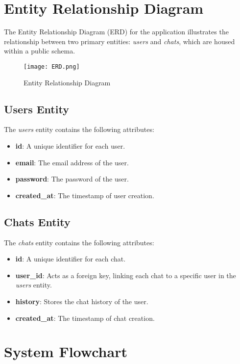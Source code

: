 \section{Entity Relationship Diagram}

The Entity Relationship Diagram (ERD) for the application illustrates the relationship between two primary entities: \textit{users} and \textit{chats}, which are housed within a public schema.

\begin{figure}[h]
  \centering
  \texttt{[image: ERD.png]}
  \caption{Entity Relationship Diagram}\label{fig:erd}
\end{figure}

\subsection*{Users Entity}

The \textit{users} entity contains the following attributes:

\begin{itemize}
  \item \textbf{id}: A unique identifier for each user.
  \item \textbf{email}: The email address of the user.
  \item \textbf{password}: The password of the user.
  \item \textbf{created\_at}: The timestamp of user creation.
\end{itemize}

\subsection*{Chats Entity}

The \textit{chats} entity contains the following attributes:

\begin{itemize}
  \item \textbf{id}: A unique identifier for each chat.
  \item \textbf{user\_id}: Acts as a foreign key, linking each chat to a specific user in the \textit{users} entity.
  \item \textbf{history}: Stores the chat history of the user.
  \item \textbf{created\_at}: The timestamp of chat creation.
\end{itemize}

\section{System Flowchart}

